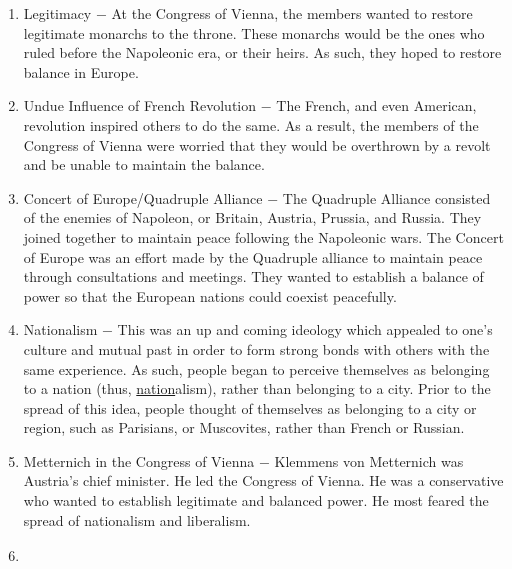 \documentclass[12pt]{article}
\begin{document}
\begin{enumerate}
\item Legitimacy $-$ At the Congress of Vienna, the members wanted to restore legitimate monarchs to the throne. These monarchs would be the ones who ruled before the Napoleonic era, or their heirs. As such, they hoped to restore balance in Europe.

\item Undue Influence of French Revolution $-$ The French, and even American, revolution inspired others to do the same. As a result, the members of the Congress of Vienna were worried that they would be overthrown by a revolt and be unable to maintain the balance.

\item Concert of Europe/Quadruple Alliance $-$ The Quadruple Alliance consisted of the enemies of Napoleon, or Britain, Austria, Prussia, and Russia. They joined together to maintain peace following the Napoleonic wars. The Concert of Europe was an effort made by the Quadruple alliance to maintain peace through consultations and meetings. They wanted to establish a balance of power so that the European nations could coexist peacefully.

\item Nationalism $-$ This was an up and coming ideology which appealed to one's culture and mutual past in order to form strong bonds with others with the same experience. As such, people began to perceive themselves as belonging to a nation (thus, \underline{nation}alism), rather than belonging to a city. Prior to the spread of this idea, people thought of themselves as belonging to a city or region, such as Parisians, or Muscovites, rather than French or Russian.

\item Metternich in the Congress of Vienna $-$ Klemmens von Metternich was Austria's chief minister. He led the Congress of Vienna. He was a conservative who wanted to establish legitimate and balanced power. He most feared the spread of nationalism and liberalism.

\item \begin{tabular}{p{} p{} p{} p{}}


\end{tabular}
\end{enumerate}
\end{document}
